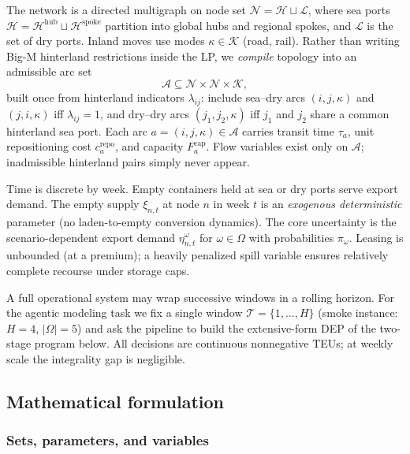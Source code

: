 \documentclass[a4paper,fleqn]{cas-sc}
\begin{document}
The network is a directed multigraph on node set
$\mathcal{N}=\mathcal{H}\sqcup\mathcal{L}$, where sea ports
$\mathcal{H}=\mathcal{H}^{\mathrm{hub}}\sqcup\mathcal{H}^{\mathrm{spoke}}$
partition into global hubs and regional spokes, and $\mathcal{L}$ is the set
of dry ports. Inland moves use modes $\kappa\in\mathcal{K}$ (road, rail).
Rather than writing Big-M hinterland restrictions inside the LP, we
\emph{compile} topology into an admissible arc set
\begin{equation}
\mathcal{A}
\subseteq
\mathcal{N}\times\mathcal{N}\times\mathcal{K},
\label{eq:arc-set}
\end{equation}
built once from hinterland indicators $\lambda_{ij}$: include sea--dry arcs
$(i,j,\kappa)$ and $(j,i,\kappa)$ iff $\lambda_{ij}=1$, and dry--dry arcs
$(j_1,j_2,\kappa)$ iff $j_1$ and $j_2$ share a common hinterland sea port.
Each arc $a=(i,j,\kappa)\in\mathcal{A}$ carries transit time
$\tau_a$, unit repositioning cost $c_a^{\mathrm{repo}}$, and capacity
$F_a^{\mathrm{cap}}$. Flow variables exist only on $\mathcal{A}$;
inadmissible hinterland pairs simply never appear.

Time is discrete by week. Empty containers held at sea or dry ports serve
export demand. The empty supply $\xi_{n,t}$ at node $n$ in week $t$ is an
\emph{exogenous deterministic} parameter (no laden-to-empty conversion
dynamics). The core uncertainty is the scenario-dependent export demand
$\eta_{n,t}^{\omega}$ for $\omega\in\Omega$ with probabilities $\pi_{\omega}$.
Leasing is unbounded (at a premium); a heavily penalized spill variable
ensures relatively complete recourse under storage caps.

A full operational system may wrap successive windows in a rolling horizon.
For the agentic modeling task we fix a single window
$\mathcal{T}=\{1,\dots,H\}$ (smoke instance: $H{=}4$, $|\Omega|{=}5$) and ask
the pipeline to build the extensive-form DEP of the two-stage program below.
All decisions are continuous nonnegative TEUs; at weekly scale the integrality
gap is negligible.

\subsection{Mathematical formulation}
\label{sec:ecr_formulation}

\subsubsection{Sets, parameters, and variables}
\label{sec:ecr_notation}
\end{document}
